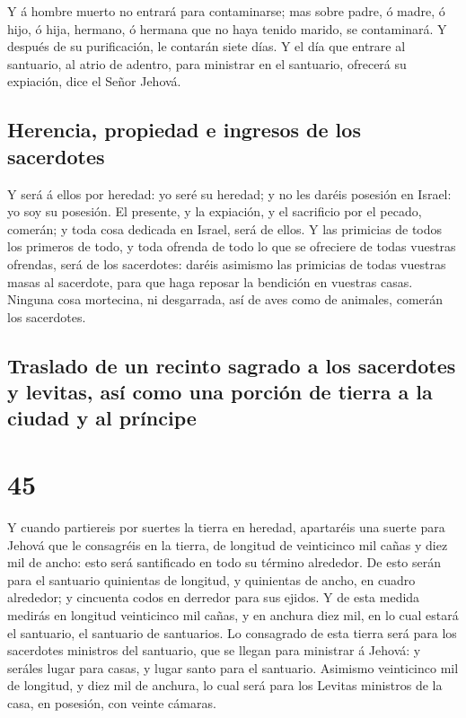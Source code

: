  Y á hombre muerto no entrará para contaminarse; mas sobre
padre, ó madre, ó hijo, ó hija, hermano, ó hermana que no haya tenido
marido, se contaminará.  Y después de su purificación, le
contarán siete días.  Y el día que entrare al santuario, al
atrio de adentro, para ministrar en el santuario, ofrecerá su expiación,
dice el Señor Jehová.

\hypertarget{herencia-propiedad-e-ingresos-de-los-sacerdotes}{%
\subsection{Herencia, propiedad e ingresos de los
sacerdotes}\label{herencia-propiedad-e-ingresos-de-los-sacerdotes}}

 Y será á ellos por heredad: yo seré su heredad; y no les
daréis posesión en Israel: yo soy su posesión.  El
presente, y la expiación, y el sacrificio por el pecado, comerán; y toda
cosa dedicada en Israel, será de ellos.  Y las primicias de
todos los primeros de todo, y toda ofrenda de todo lo que se ofreciere
de todas vuestras ofrendas, será de los sacerdotes: daréis asimismo las
primicias de todas vuestras masas al sacerdote, para que haga reposar la
bendición en vuestras casas.  Ninguna cosa mortecina, ni
desgarrada, así de aves como de animales, comerán los sacerdotes.

\hypertarget{traslado-de-un-recinto-sagrado-a-los-sacerdotes-y-levitas-asuxed-como-una-porciuxf3n-de-tierra-a-la-ciudad-y-al-pruxedncipe}{%
\subsection{Traslado de un recinto sagrado a los sacerdotes y levitas,
así como una porción de tierra a la ciudad y al
príncipe}\label{traslado-de-un-recinto-sagrado-a-los-sacerdotes-y-levitas-asuxed-como-una-porciuxf3n-de-tierra-a-la-ciudad-y-al-pruxedncipe}}

\hypertarget{section-44}{%
\section{45}\label{section-44}}

 Y cuando partiereis por suertes la tierra en heredad,
apartaréis una suerte para Jehová que le consagréis en la tierra, de
longitud de veinticinco mil cañas y diez mil de ancho: esto será
santificado en todo su término alrededor.  De esto serán
para el santuario quinientas de longitud, y quinientas de ancho, en
cuadro alrededor; y cincuenta codos en derredor para sus ejidos.
 Y de esta medida medirás en longitud veinticinco mil cañas,
y en anchura diez mil, en lo cual estará el santuario, el santuario de
santuarios.  Lo consagrado de esta tierra será para los
sacerdotes ministros del santuario, que se llegan para ministrar á
Jehová: y seráles lugar para casas, y lugar santo para el santuario.
 Asimismo veinticinco mil de longitud, y diez mil de
anchura, lo cual será para los Levitas ministros de la casa, en
posesión, con veinte cámaras.

